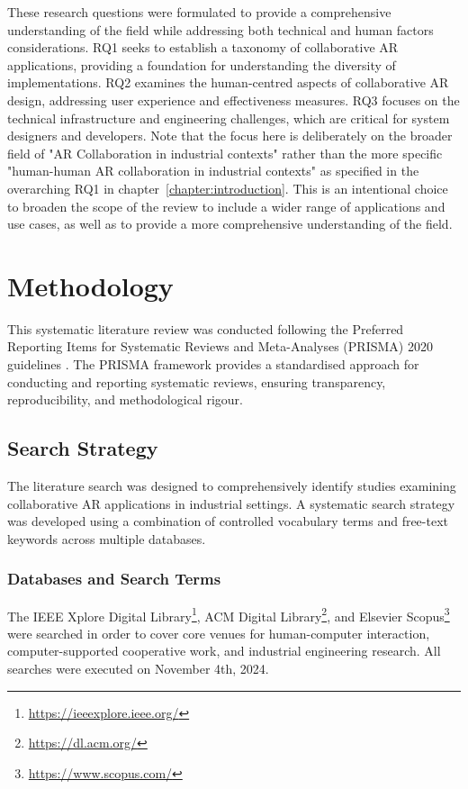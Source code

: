 These research questions were formulated to provide a comprehensive understanding of the field while addressing both technical and human factors considerations. RQ1 seeks to establish a taxonomy of collaborative AR applications, providing a foundation for understanding the diversity of implementations. RQ2 examines the human-centred aspects of collaborative AR design, addressing user experience and effectiveness measures. RQ3 focuses on the technical infrastructure and engineering challenges, which are critical for system designers and developers. Note that the focus here is deliberately on the broader field of "AR Collaboration in industrial contexts" rather than the more specific "human-human AR collaboration in industrial contexts" as specified in the overarching RQ1 in chapter~\ref{chapter:introduction}. This is an intentional choice to broaden the scope of the review to include a wider range of applications and use cases, as well as to provide a more comprehensive understanding of the field.


\section{Methodology}
\label{sec:lit-methodology}

This systematic literature review was conducted following the Preferred Reporting Items for Systematic Reviews and Meta-Analyses (PRISMA) 2020 guidelines \cite{page2021prisma}. The PRISMA framework provides a standardised approach for conducting and reporting systematic reviews, ensuring transparency, reproducibility, and methodological rigour.

\subsection{Search Strategy}
\label{subsec:search-strategy}

The literature search was designed to comprehensively identify studies examining collaborative AR applications in industrial settings. A systematic search strategy was developed using a combination of controlled vocabulary terms and free-text keywords across multiple databases.

\subsubsection{Databases and Search Terms}

The IEEE Xplore Digital Library\footnote{\url{https://ieeexplore.ieee.org/}}, ACM Digital Library\footnote{\url{https://dl.acm.org/}}, and Elsevier Scopus\footnote{\url{https://www.scopus.com/}} were searched in order to cover core venues for human-computer interaction, computer-supported cooperative work, and industrial engineering research. All searches were executed on November 4th, 2024.

